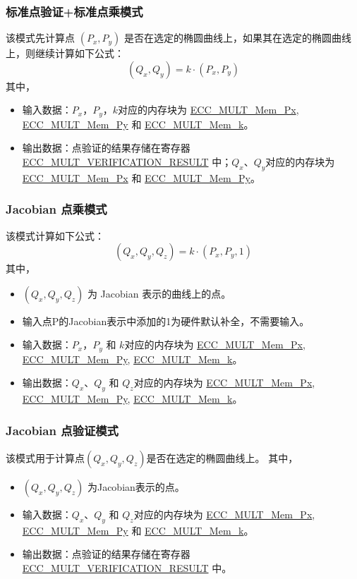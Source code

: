 \documentclass[main\_\_CN.tex]{subfiles}
\begin{document}
\subsubsection{标准点验证+标准点乘模式}
该模式先计算点 $(P_x,P_y)$ 是否在选定的椭圆曲线上，如果其在选定的椭圆曲线上，则继续计算如下公式：
\[
(Q_x,Q_y) = k \cdot (P_x,P_y)
\]
其中，
\begin{itemize}
    \item 输入数据：$P_x$，$P_y$，$k$对应的内存块为 \hyperref[tab:ecc-memory]{ECC\_MULT\_Mem\_Px}, \hyperref[tab:ecc-memory]{ECC\_MULT\_Mem\_Py} 和 \hyperref[tab:ecc-memory]{ECC\_MULT\_Mem\_k}。
    \item 输出数据：点验证的结果存储在寄存器 \hyperref[fielddesc:ECCMULTVERIFICATIONRESULT]{ECC\_MULT\_VERIFICATION\_RESULT} 中；$Q_x$、$Q_y$对应的内存块为 \hyperref[tab:ecc-memory]{ECC\_MULT\_Mem\_Px} 和 \hyperref[tab:ecc-memory]{ECC\_MULT\_Mem\_Py}。
\end{itemize}
\clearpage
\subsubsection{Jacobian 点乘模式}
该模式计算如下公式：
\[
(Q_x,Q_y,Q_z) = k \cdot (P_x,P_y,1)
\]
其中，
\begin{itemize}
    \item $(Q_x,Q_y,Q_z)$ 为 Jacobian 表示的曲线上的点。
    \item 输入点P的Jacobian表示中添加的1为硬件默认补全，不需要输入。
    \item 输入数据：$P_x$，$P_y$ 和 $k$对应的内存块为 \hyperref[tab:ecc-memory]{ECC\_MULT\_Mem\_Px}, \hyperref[tab:ecc-memory]{ECC\_MULT\_Mem\_Py}, \hyperref[tab:ecc-memory]{ECC\_MULT\_Mem\_k}。
    \item 输出数据：$Q_x$、$Q_y$ 和 $Q_z$对应的内存块为 \hyperref[tab:ecc-memory]{ECC\_MULT\_Mem\_Px}, \hyperref[tab:ecc-memory]{ECC\_MULT\_Mem\_Py}, \hyperref[tab:ecc-memory]{ECC\_MULT\_Mem\_k}。
\end{itemize}
\subsubsection{Jacobian 点验证模式}
该模式用于计算点$(Q_x,Q_y,Q_z)$是否在选定的椭圆曲线上。
其中，
\begin{itemize}
    \item $(Q_x,Q_y,Q_z)$ 为Jacobian表示的点。
    \item 输入数据：$Q_x$、$Q_y$ 和 $Q_z$对应的内存块为 \hyperref[tab:ecc-memory]{ECC\_MULT\_Mem\_Px}, \hyperref[tab:ecc-memory]{ECC\_MULT\_Mem\_Py} 和 \hyperref[tab:ecc-memory]{ECC\_MULT\_Mem\_k}。
    \item 输出数据：点验证的结果存储在寄存器 \hyperref[fielddesc:ECCMULTVERIFICATIONRESULT]{ECC\_MULT\_VERIFICATION\_RESULT} 中。
\end{itemize}
\end{document}
